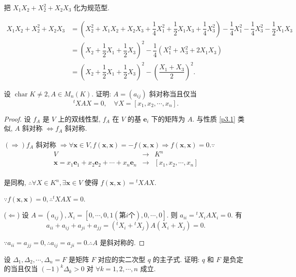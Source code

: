 \documentclass{ctexart}
\begin{document}
\begin{exercisec}%
    把 $X_1X_2+X_2^2+X_2X_3$ 化为规范型.
\end{exercisec}
\begin{solution}
    \begin{align*}
        X_1X_2+X_2^2+X_2X_3 & =\left(X_2^2+X_1X_2+X_2X_3+\dfrac{1}{4}X_1^2+\dfrac{1}{2}X_1X_3+\dfrac{1}{4}X_3^2\right)-\dfrac{1}{4}X_1^2-\dfrac{1}{4}X_3^2-\dfrac{1}{2}X_1X_3 \\
        & =\left(X_2+\dfrac{1}{2}X_1+\dfrac{1}{2}X_3\right)^2-\dfrac{1}{4}(X_1^2+X_3^2+2X_1X_3) \\
        & =\left(X_2+\dfrac{1}{2}X_1+\dfrac{1}{2}X_3\right)^2-\left(\dfrac{X_1+X_3}{2}\right)^2.
    \end{align*}
\end{solution}
\begin{exercisec}%
    设 $\operatorname{char} K\neq 2,A\in M_n(K)$. 证明: $A=(a_{ij})$ 斜对称当且仅当
    \[{}^tXAX=0,\quad\forall X=[x_1,x_2,\cdots,x_n].\]
\end{exercisec}
\begin{proof}
    设 $f_A$ 是 $V$ 上的双线性型, $f_A$ 在 $V$ 的基 $\boldsymbol{e}_i$ 下的矩阵为 $A$. 与性质 \ref{p3.1} 类似, $A$ 斜对称 $\Leftrightarrow f_A$ 斜对称.

    $(\Rightarrow)f_A$ 斜对称 $\Rightarrow\forall\boldsymbol{x}\in V,f(\boldsymbol{x},\boldsymbol{x})=-f(\boldsymbol{x},\boldsymbol{x})\Rightarrow f(\boldsymbol{x},\boldsymbol{x})=0.\because$
    \[\begin{array}{rcl}
        V & \to & K^n \\
        \boldsymbol{x}=x_1\boldsymbol{e}_1+x_2\boldsymbol{e}_2+\cdots+x_n\boldsymbol{e}_n & \to & [x_1,x_2,\cdots,x_n] \\
    \end{array}\]

    是同构, $\therefore\forall X\in K^n,\exists\boldsymbol{x}\in V$ 使得 $f(\boldsymbol{x},\boldsymbol{x})={}^tXAX$.

    $\because f(\boldsymbol{x},\boldsymbol{x})=0,\therefore{}^tXAX=0$.

    ($\Leftarrow$) 设 $A=(a_{ij}),X_i=[0,\cdots,0,1(\text{第}i\text{个}),0,\cdots,0]$. 则 $a_{ii}={}^tX_iAX_i=0$. 有
    \[a_{ii}+a_{ij}+a_{ji}+a_{jj}=({}^tX_i+{}^tX_j)A(X_i+X_j)=0.\]

    $\because a_{ii}=a_{jj}=0,\therefore a_{ij}=a_{ji}=0.\therefore A$ 是斜对称的.
\end{proof}
\begin{exercise}\label{ex4.1}
    设 $\Delta_1,\Delta_2,\cdots,\Delta_n=F$ 是矩阵 $F$ 对应的实二次型 $q$ 的主子式. 证明: $q$ 和 $F$ 是负定的当且仅当 $(-1)^k\Delta_k>0$ 对 $\forall k=1,2,\cdots,n$ 成立.
\end{exercise}
\end{document}
